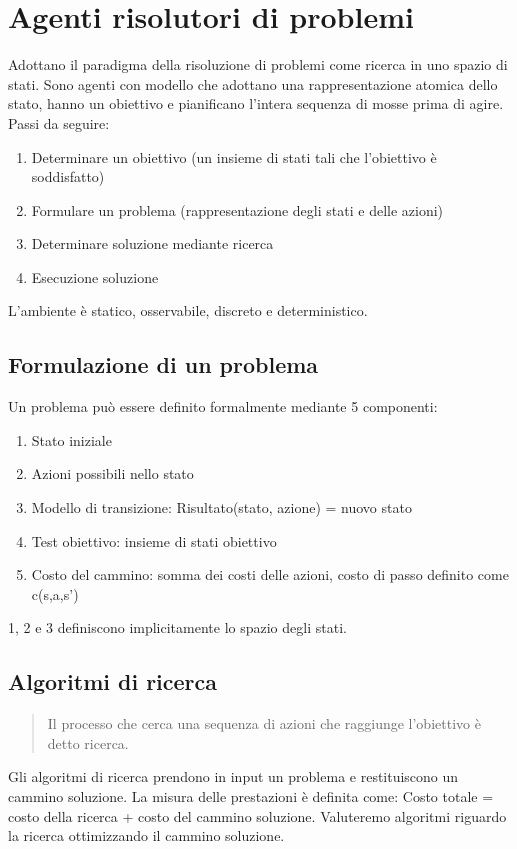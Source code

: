 \documentclass{article}
\begin{document}
\section{Agenti risolutori di problemi}
Adottano il paradigma della risoluzione di problemi come ricerca in uno spazio di stati. Sono agenti con modello che adottano una rappresentazione atomica dello stato, hanno un obiettivo e pianificano l'intera sequenza di mosse prima di agire. \newline
Passi da seguire:
\begin{enumerate}
    \item Determinare un obiettivo (un insieme di stati tali che l'obiettivo è soddisfatto)
    \item Formulare un problema (rappresentazione degli stati e delle azioni)
    \item Determinare soluzione mediante ricerca
    \item Esecuzione soluzione
\end{enumerate}
L'ambiente è statico, osservabile, discreto e deterministico.

\subsection{Formulazione di un problema}
Un problema può essere definito formalmente mediante 5 componenti:
\begin{enumerate}
    \item Stato iniziale
    \item Azioni possibili nello stato
    \item Modello di transizione: Risultato(stato, azione) = nuovo stato
    \item Test obiettivo: insieme di stati obiettivo
    \item Costo del cammino: somma dei costi delle azioni, costo di passo definito come c(s,a,s')
\end{enumerate}
1, 2 e 3 definiscono implicitamente lo spazio degli stati.

\subsection{Algoritmi di ricerca}
\begin{quote}
    Il processo che cerca una sequenza di azioni che raggiunge l'obiettivo è detto ricerca.
\end{quote}
Gli algoritmi di ricerca prendono in input un problema e restituiscono un cammino soluzione. La misura delle prestazioni è definita come: Costo totale = costo della ricerca + costo del cammino soluzione. Valuteremo algoritmi riguardo la ricerca ottimizzando il cammino soluzione.
\end{document}
